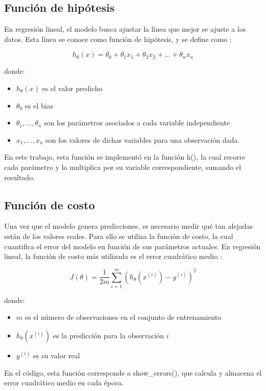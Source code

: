 \documentclass[10pt,journal,compsoc]{IEEEtran}
\begin{document}
\subsection{Función de hipótesis}
En regresión lineal, el modelo busca ajustar la línea que mejor se ajuste a los datos. Esta línea se conoce como función de hipótesis, y se define como \cite{funciones}:

\begin{equation}
h_\theta(x) = \theta_0 + \theta_1 x_1 + \theta_2 x_2 + \dots + \theta_n x_n
\label{eq:hypothesis}
\end{equation}

donde:
\begin{itemize}
\item $h_\theta(x)$ es el valor predicho
\item $\theta_0$ es el bias
\item $\theta_1, \dots, \theta_n$ son los parámetros asociados a cada variable independiente
\item $x_1, \dots, x_n$ son los valores de dichas variables para una observación dada. 
\end{itemize}
En este trabajo, esta función se implementó en la función h(), la cual recorre cada parámetro y lo multiplica por su variable correspondiente, sumando el resultado.

\subsection{Función de costo}
Una vez que el modelo genera predicciones, es necesario medir qué tan alejadas están de los valores reales. Para ello se utiliza la función de costo, la cual cuantifica el error del modelo en función de sus parámetros actuales. En regresión lineal, la función de costo más utilizada es el error cuadrático medio \cite{funcion_costo}:

\begin{equation}
J(\theta) = \frac{1}{2m} \sum_{i=1}^{m} \left( h_\theta(x^{(i)}) - y^{(i)} \right)^2
\label{eq:cost}
\end{equation}

donde:
\begin{itemize}
    \item $m$ es el número de observaciones en el conjunto de entrenamiento
    \item $h_\theta(x^{(i)})$ es la predicción para la observación $i$
    \item $y^{(i)}$ es su valor real
\end{itemize}
 En el código, esta función corresponde a show\_errors(), que calcula y almacena el error cuadrático medio en cada época.
\end{document}
